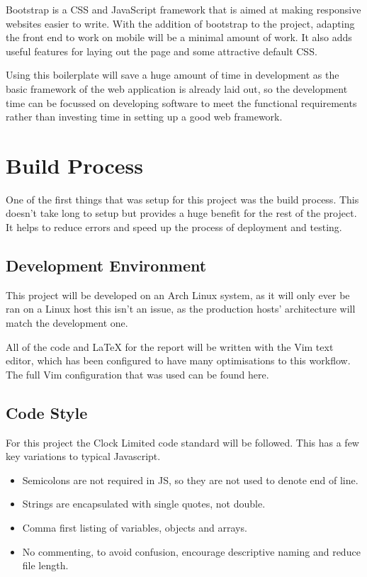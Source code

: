     Bootstrap is a CSS and JavaScript framework that is aimed at making responsive websites easier to write. With the addition of bootstrap to the project, adapting the front end to work on mobile will be a minimal amount of work. It also adds useful features for laying out the page and some attractive default CSS. 

Using this boilerplate will save a huge amount of time in development as the basic framework of the web application is already laid out, so the development time can be focussed on developing software to meet the functional requirements rather than investing time in setting up a good web framework. 

\section{Build Process}
  One of the first things that was setup for this project was the build process. This doesn't take long to setup but provides a huge benefit for the rest of the project. It helps to reduce errors and speed up the process of deployment and testing.

  \subsection{Development Environment}
    This project will be developed on an Arch Linux system, as it will only ever be ran on a Linux host this isn't an issue, as the production hosts' architecture will match the development one. 

    All of the code and LaTeX for the report will be written with the Vim text editor, which has been configured to have many optimisations to this workflow. The full Vim configuration that was used can be found here\cite{vimrc}.

  \subsection{Code Style}
  For this project the Clock Limited code standard\cite{clockstandard} will be followed. This has a few key variations to typical Javascript. 

  \begin{itemize}
    \item Semicolons are not required in JS, so they are not used to denote end of line.
    \item Strings are encapsulated with single quotes, not double. 
    \item Comma first\cite{commafirst} listing of variables, objects and arrays.
    \item No commenting, to avoid confusion, encourage descriptive naming and reduce file length.
  \end{itemize}

